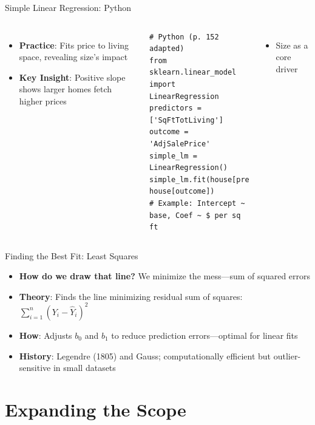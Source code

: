 \documentclass{beamer}
\begin{document}
	\begin{frame}[fragile]{Simple Linear Regression: Python}
		\lstset{language=Python}
		\begin{columns}
			\begin{itemize}
				\item \textbf{Practice}: Fits price to living space, revealing size’s impact
				\item \textbf{Key Insight}: Positive slope shows larger homes fetch higher prices
			\end{itemize}
			\begin{lstlisting}
# Python (p. 152 adapted)
from sklearn.linear_model import LinearRegression
predictors = ['SqFtTotLiving']
outcome = 'AdjSalePrice'
simple_lm = LinearRegression()
simple_lm.fit(house[predictors], house[outcome])
# Example: Intercept ~ base, Coef ~ $ per sq ft
			\end{lstlisting}
			\begin{itemize}
				\item Size as a core driver
			\end{itemize}
		\end{columns}
	\end{frame}
	
	\begin{frame}{Finding the Best Fit: Least Squares}
		\begin{itemize}
			 \item \textbf{How do we draw that line?} We minimize the mess—sum of squared errors
			\item \textbf{Theory}: Finds the line minimizing residual sum of squares: $\sum_{i=1}^n (Y_i - \hat{Y}_i)^2$
			\item \textbf{How}: Adjusts $b_0$ and $b_1$ to reduce prediction errors—optimal for linear fits
			\item \textbf{History}: Legendre (1805) and Gauss; computationally efficient but outlier-sensitive in small datasets
		\end{itemize}
	\end{frame}
	
	\section{Expanding the Scope}
	
\end{document}
